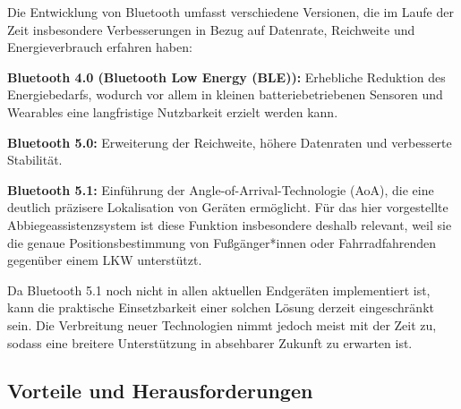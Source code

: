 \documentclass[a4paper, 12pt]{article} %
\begin{document}
\begin{spacing}{1.8}  %
\fontsize{14pt}{15pt}\selectfont  %

Die Entwicklung von Bluetooth umfasst verschiedene Versionen, die im Laufe der Zeit insbesondere Verbesserungen in Bezug auf Datenrate, Reichweite und Energieverbrauch erfahren haben:

\textbf{Bluetooth 4.0 (Bluetooth Low Energy (BLE)):} Erhebliche Reduktion des Energiebedarfs, wodurch vor allem in kleinen batteriebetriebenen Sensoren und Wearables eine langfristige Nutzbarkeit erzielt werden kann.

\textbf{Bluetooth 5.0:} Erweiterung der Reichweite, höhere Datenraten und verbesserte Stabilität.

\textbf{Bluetooth 5.1:} Einführung der Angle-of-Arrival-Technologie (AoA), die eine deutlich präzisere Lokalisation von Geräten ermöglicht. Für das hier vorgestellte Abbiegeassistenzsystem ist diese Funktion insbesondere deshalb relevant, weil sie 
die genaue Positionsbestimmung von Fußgänger*innen oder Fahrradfahrenden gegenüber einem LKW unterstützt.

Da Bluetooth 5.1 noch nicht in allen aktuellen Endgeräten implementiert ist, kann die praktische Einsetzbarkeit einer solchen Lösung derzeit eingeschränkt sein. Die Verbreitung neuer Technologien nimmt jedoch meist mit der Zeit zu, sodass eine breitere Unterstützung in absehbarer Zukunft zu erwarten ist.

\end{spacing}

\subsection{Vorteile und Herausforderungen}
\end{document}
